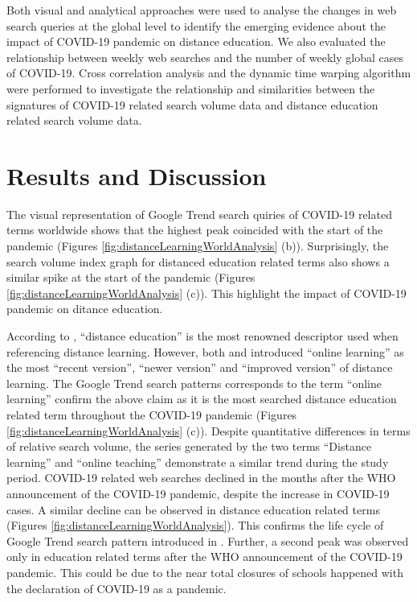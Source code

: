 \documentclass[11pt,a4paper,]{article}
\begin{document}
Both visual and analytical approaches were used to analyse the changes in web search queries at the global level to identify the emerging evidence about the impact of COVID-19 pandemic on distance education. We also evaluated the relationship between weekly web searches and the number of weekly global cases of COVID-19. Cross correlation analysis and the dynamic time warping algorithm \autocite{giorgino2009computing} were performed to investigate the relationship and similarities between the signatures of COVID-19 related search volume data and distance education related search volume data.

\hypertarget{results-and-discussion}{%
\section{Results and Discussion}\label{results-and-discussion}}

The visual representation of Google Trend search quiries of COVID-19 related terms worldwide shows that the highest peak coincided with the start of the pandemic (Figures \ref{fig:distanceLearningWorldAnalysis} (b)). Surprisingly, the search volume index graph for distanced education related terms also shows a similar spike at the start of the pandemic (Figures \ref{fig:distanceLearningWorldAnalysis} (c)). This highlight the impact of COVID-19 pandemic on ditance education.

According to \textcite{moore2011learning}, ``distance education'' is the most renowned descriptor used when referencing distance learning. However, both \textcite{benson2002usability} and \textcite{conrad2002deep} introduced ``online learning'' as the most ``recent version'', ``newer version'' and ``improved version'' of distance learning. The Google Trend search patterns corresponds to the term ``online learning'' confirm the above claim as it is the most searched distance education related term throughout the COVID-19 pandemic (Figures \ref{fig:distanceLearningWorldAnalysis} (c)). Despite quantitative differences in terms of relative search volume, the series generated by the two terms ``Distance learning'' and ``online teaching'' demonstrate a similar trend during the study period. COVID-19 related web searches declined in the months after the WHO announcement of the COVID-19 pandemic, despite the increase in COVID-19 cases. A similar decline can be observed in distance education related terms (Figures \ref{fig:distanceLearningWorldAnalysis}). This confirms the life cycle of Google Trend search pattern introduced in \textcite{jarynowski2020perception}. Further, a second peak was observed only in education related terms after the WHO announcement of the COVID-19 pandemic. This could be due to the near total closures of schools happened with the declaration of COVID-19 as a pandemic.
\end{document}
